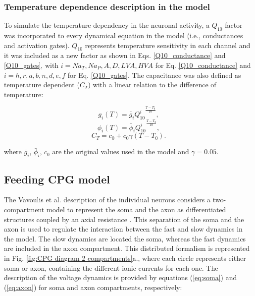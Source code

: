 \subsubsection{Temperature dependence description in the model}
\label{sec:model equations temperature}
To simulate the temperature dependency in the neuronal activity, a $Q_{10}$ factor was incorporated to every dynamical equation in the model (i.e., conductances and activation gates). $Q_{10}$ represents temperature sensitivity in each channel and it was included as a new factor as shown in Eqs. \ref{Q10_conductance} and \ref{Q10_gates}, with $i=Na_T,Na_P,A,D,LVA,HVA$ for Eq. \ref{Q10_conductance} and $i=h,r,a,b,n,d,e,f$ for Eq. \ref{Q10_gates}. The capacitance was also defined as temperature dependent ($C_T$) with a linear relation to the difference of temperature: 

\begin{equation}g_i(T)=\bar{g}_i{Q^i_{10}}^{\frac{T-T_0}{10}},
	\label{Q10_conductance}
\end{equation}
\begin{equation}\phi_i(T)=\bar{\phi}_i{Q^i_{10}}^{\frac{T-T_0}{10}},
	\label{Q10_gates}\end{equation}
\begin{equation}C_T=c_0 + c_0 \gamma(T-T_0).\end{equation}


where $\bar{g}_i$, $\bar{\phi}_i$, $c_0$ are the original values used in the model and $\gamma = 0.05$.

\subsection{Feeding CPG model}
\label{sec:CPG model}
The Vavoulis et al. description of the individual neurons considers a two-compartment model to represent the soma and the axon as  differentiated structures coupled by an axial resistance \cite{Vavoulis2007}. This separation of the soma and the axon is used to regulate the interaction between the fast and slow dynamics in the model. The slow dynamics are located the soma, whereas the fast dynamics are included in the axon compartment. This distributed formalism is represented in Fig. \ref{fig:CPG diagram 2 compartments}a., where each circle represents either soma or axon, containing the different ionic currents for each one. The description of the voltage dynamics is provided by equations (\ref{eq:soma}) and (\ref{eq:axon}) for soma and axon compartments, respectively: 

